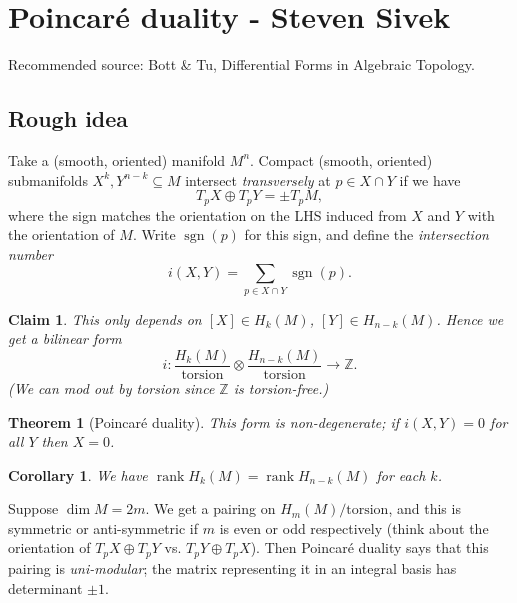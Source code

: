 \documentclass[a4paper]{article}
\newtheorem*{theorem}{Theorem}
\newtheorem*{corollary}{Corollary}
\newtheorem*{claim}{Claim}
\theoremstyle{definition}
\theoremstyle{remark}
\DeclareMathOperator{\sgn}{sgn}
\DeclareMathOperator{\rank}{rank}
\newcommand{\Z}{\mathbb{Z}}
\begin{document}
\section{Poincar\'e duality - Steven Sivek}

Recommended source: Bott \& Tu, Differential Forms in Algebraic Topology.

\subsection*{Rough idea}

Take a (smooth, oriented) manifold $M^n$. Compact (smooth, oriented) submanifolds
$X^k,Y^{n-k}\subseteq M$ intersect \emph{transversely} at $p\in X\cap Y$ if we
have
\begin{equation*}
    T_pX\oplus T_pY = \pm T_pM,
\end{equation*}
where the sign matches the orientation on the LHS induced from $X$ and $Y$ with
the orientation of $M$. Write $\sgn(p)$ for this sign, and define the
\emph{intersection number}
\begin{equation*}
    i(X,Y) = \sum_{p\in X\cap Y}\sgn(p).
\end{equation*}

\begin{claim}
    This only depends on $[X]\in H_k(M)$, $[Y]\in H_{n-k}(M)$. Hence we get a
    bilinear form
    \begin{equation*}
        i:\frac{H_k(M)}{\text{torsion}}
            \otimes\frac{H_{n-k}(M)}{\text{torsion}}\to\Z.
    \end{equation*}
    (We can mod out by torsion since $\Z$ is torsion-free.)
\end{claim}

\begin{theorem}[Poincar\'e duality]
    This form is non-degenerate; if $i(X,Y)=0$ for all $Y$ then $X=0$.
\end{theorem}

\begin{corollary}
    We have $\rank H_k(M)=\rank H_{n-k}(M)$ for each $k$.
\end{corollary}

Suppose $\dim M=2m$. We get a pairing on $H_m(M)/\text{torsion}$, and this is
symmetric or anti-symmetric if $m$ is even or odd respectively (think about the
orientation of $T_pX\oplus T_pY$ vs. $T_pY\oplus T_pX$). Then Poincar\'e duality
says that this pairing is \emph{uni-modular}; the matrix representing it in an
integral basis has determinant $\pm1$.
\end{document}
